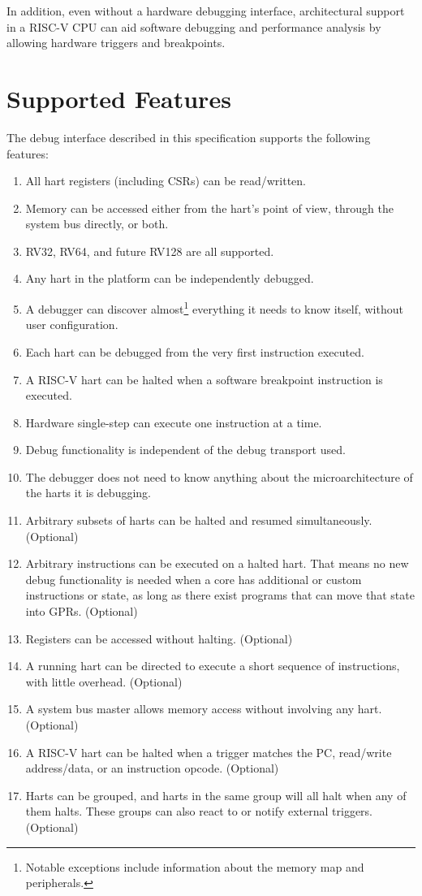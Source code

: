 In addition, even without a hardware debugging interface,
architectural support in a RISC-V CPU can aid software debugging and
performance analysis by allowing hardware triggers and breakpoints.

\section{Supported Features}

The debug interface described in this specification supports the following features:

\begin{enumerate}
   \item All hart registers (including CSRs) can be read/written.
   \item Memory can be accessed either from the hart's point of view, through
       the system bus directly, or both.
   \item RV32, RV64, and future RV128 are all supported.
   \item Any hart in the platform can be independently debugged.
   \item A debugger can discover almost\footnote{Notable exceptions include
       information about the memory map and peripherals.} everything it needs
       to know itself, without user configuration.
   \item Each hart can be debugged from the very first instruction executed.
   \item A RISC-V hart can be halted when a software breakpoint instruction is
       executed.
   \item Hardware single-step can execute one instruction at a time.
   \item Debug functionality is independent of the debug transport used.
   \item The debugger does not need to know anything about the microarchitecture
       of the harts it is debugging.

   \item Arbitrary subsets of harts can be halted and resumed simultaneously.
       (Optional)
   \item Arbitrary instructions can be executed on
       a halted hart. That means no new debug functionality is needed when a
       core has additional or custom instructions or state, as
       long as there exist programs
       that can move that state into GPRs. (Optional)
   \item Registers can be accessed without halting. (Optional)
   \item A running hart can be directed to execute a short sequence
       of instructions, with little overhead. (Optional)
   \item A system bus master allows memory access without
       involving any hart. (Optional)
   \item A RISC-V hart can be halted when a trigger matches the PC,
       read/write address/data, or an instruction opcode. (Optional)
    \item Harts can be grouped, and harts in the same group will all halt when
        any of them halts. These groups can also react to or notify external
        triggers. (Optional)
\end{enumerate}

